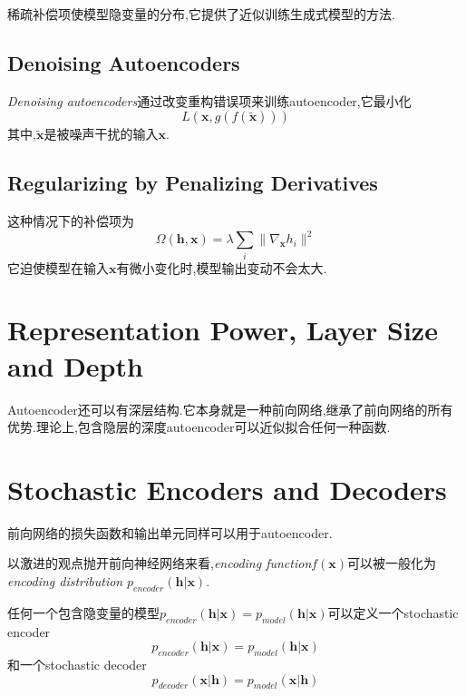 稀疏补偿项使模型隐变量的分布,它提供了近似训练生成式模型的方法.

\subsection{Denoising Autoencoders}

\textit{Denoising autoencoders}通过改变重构错误项来训练autoencoder,它最小化
\begin{equation}
L(\bm x,g(f(\tilde{\bm x})))
\end{equation}
其中,$\tilde{\bm x}$是被噪声干扰的输入$\bm x$.

\subsection{Regularizing by Penalizing Derivatives}

这种情况下的补偿项为
\begin{equation}
\Omega(\bm{h,x})=\lambda\sum_i\|\nabla_{\bm x}h_i\|^2
\end{equation}
它迫使模型在输入$\bm x$有微小变化时,模型输出变动不会太大.

\section{Representation Power, Layer Size and Depth}

Autoencoder还可以有深层结构.它本身就是一种前向网络,继承了前向网络的所有优势.理论上,包含隐层的深度autoencoder可以近似拟合任何一种函数.

\section{Stochastic Encoders and Decoders}

前向网络的损失函数和输出单元同样可以用于autoencoder.

以激进的观点抛开前向神经网络来看,\textit{encoding function}$f(\bm x)$可以被一般化为\textit{encoding distribution} $p_{encoder}(\bm{h|x})$.

任何一个包含隐变量的模型$p_{encoder}(\bm{h|x})=p_{model}(\bm{h|x})$可以定义一个stochastic encoder
\begin{equation}
p_{encoder}(\bm{h|x})=p_{model}(\bm{h|x})
\end{equation}
和一个stochastic decoder
\begin{equation}
p_{decoder}(\bm{x|h})=p_{model}(\bm{x|h})
\end{equation}

